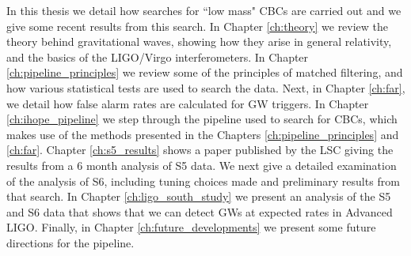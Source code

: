 In this thesis we detail how searches for ``low mass" \acp{CBC} are carried out and we give some recent results from this search. In Chapter \ref{ch:theory} we review the theory behind gravitational waves, showing how they arise in general relativity, and the basics of the \ac{LIGO}/Virgo interferometers. In Chapter \ref{ch:pipeline_principles} we review some of the principles of matched filtering, and how various statistical tests are used to search the data. Next, in Chapter \ref{ch:far}, we detail how false alarm rates are calculated for \ac{GW} triggers. In Chapter \ref{ch:ihope_pipeline} we step through the pipeline used to search for \acp{CBC}, which makes use of the methods presented in the Chapters \ref{ch:pipeline_principles} and \ref{ch:far}. Chapter \ref{ch:s5_results} shows a paper published by the \ac{LSC} giving the results from a $6$ month analysis of \ac{S5} data. We next give a detailed examination of the analysis of \ac{S6}, including tuning choices made and preliminary results from that search. In Chapter \ref{ch:ligo_south_study} we present an analysis of the \ac{S5} and \ac{S6} data that shows that we can detect \acp{GW} at expected rates in Advanced \ac{LIGO}. Finally, in Chapter \ref{ch:future_developments} we present some future directions for the pipeline.



